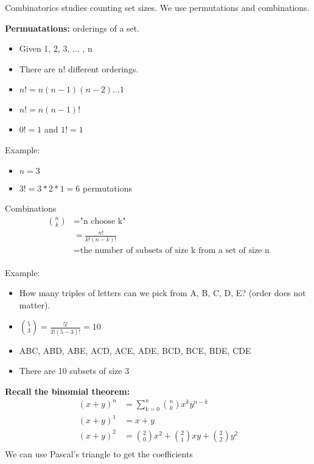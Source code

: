 \documentclass[10pt]{article}
\begin{document}
Combinatorics studies counting set sizes. We use permutations and combinations.

\textbf{Permuatations:} orderings of a set.
\begin{itemize}
    \item Given {1, 2, 3, ... , n}
    \item There are n! different orderings.
    \item $n! = n(n - 1)(n - 2) ... 1$
    \item $n! = n(n - 1)!$
    \item $0! = 1$ and $1! = 1$
\end{itemize}

Example:
\begin{itemize}
    \item $n = 3$
    \item $3! = 3 * 2 * 1 = 6$ permutations
\end{itemize}

Combinations
$$ \begin{aligned} 
    \binom{n}{k} &= \text{"n choose k"} \\
                 &= \frac{n!}{k!(n - k)!} \\
                 &= \text{the number of subsets of size k from a set of size n}
                 \\
\end{aligned}$$

Example:
\begin{itemize}
    \item How many triples of letters can we pick from A, B, C, D, E? (order
        does not matter).
    \item $\binom{5}{3} = \frac{5!}{3!(5 - 3)!} = 10$
    \item ABC, ABD, ABE, ACD, ACE, ADE, BCD, BCE, BDE, CDE
    \item There are 10 subsets of size 3
\end{itemize}

\textbf{Recall the binomial theorem:}
$$\begin{aligned}
    (x + y)^n &= \sum_{k = 0}^{n} \binom{n}{k} x^ky^{n - k}\\
    (x + y)^1 &= x + y \\
    (x + y)^2 &= \binom{2}{0}x^2 + \binom{2}{1}xy + \binom{2}{2}y^2 \\
\end{aligned}$$
We can use Pascal's triangle to get the coefficients
\end{document}
